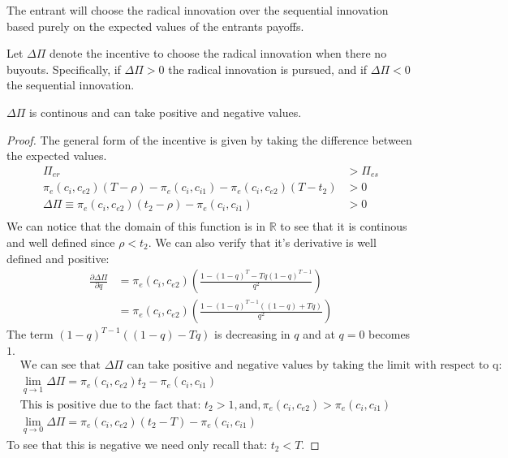 The entrant will choose the radical innovation over the sequential innovation based purely on the expected values of the entrants payoffs.
\begin{definition}
Let $\Delta \Pi$ denote the incentive to choose the radical innovation when there no buyouts. Specifically, if $\Delta \Pi >0$ the radical innovation is pursued, and if $\Delta \Pi <0$ the sequential innovation. 
\end{definition}
\begin{proposition}
$\Delta \Pi$ is continous and can take positive and negative values. 
\end{proposition}
\begin{proof}
The general form of the incentive is given by taking the difference between the expected values. 
\begin{align*}
\Pi_{er}  &> \Pi_{es}   \\
\pi_{e}(c_i,c_{e2}) \left( T - \rho \right) - \pi_e(c_i,c_{i1})  -\pi_e(c_i,c_{e2})(T-t_2) &> 0 \\
\Delta \Pi \equiv \pi_{e}(c_i,c_{e2}) \left( t_2 - \rho \right) - \pi_e(c_i,c_{i1})  &> 0 \\
\end{align*}
We can notice that the domain of this function is in $\mathbb{R}$ to see that it is continous and well defined since $\rho < t_2 $. We can also verify that it's derivative is well defined and positive: 
\begin{align*}
\frac{\partial \Delta \Pi}{\partial q} &= \pi_{e}(c_i,c_{e2})  \left(\frac{1-(1-q)^T-T q (1-q)^{T-1}}{q^2} \right) \\
& = \pi_{e}(c_i,c_{e2})  \left(\frac{1-(1-q)^{T-1}((1-q)+T q) }{q^2} \right) 
\end{align*}
The term $(1-q)^{T-1}((1-q)-T q)$ is decreasing in $q$ and at $q=0$  becomes $1$. 
\begin{align*}
&\text{We can see that } \Delta \Pi \text{ can take positive and negative values by taking the limit with respect to q:} \\
&\lim_{q \to 1}\Delta \Pi = \pi_{e}(c_i,c_{e2}) t_2  - \pi_e(c_i,c_{i1}) \\
& \text{This is positive due to the fact that: } t_2>1, \text{and}, \pi_{e}(c_i,c_{e2})>\pi_e(c_i,c_{i1}) \\
&\lim_{q \to 0}\Delta \Pi = \pi_{e}(c_i,c_{e2}) (t_2 - T)- \pi_e(c_i,c_{i1}) 
\end{align*}  
To see that this is negative we need only recall that: $t_2<T$.
\end{proof}
